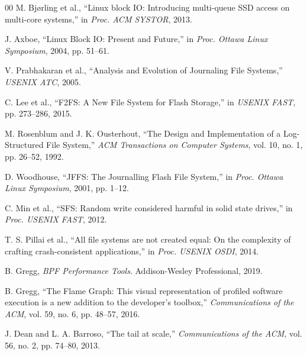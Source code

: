 \documentclass[conference]{IEEEtran}
\begin{document}
\begin{thebibliography}{00}
 M. Bj{\o}rling et al., ``Linux block IO: Introducing multi-queue SSD access on multi-core systems,'' in \textit{Proc. ACM SYSTOR}, 2013.

 J. Axboe, ``Linux Block IO: Present and Future,'' in \textit{Proc. Ottawa Linux Symposium}, 2004, pp. 51--61.

 V. Prabhakaran et al., ``Analysis and Evolution of Journaling File Systems,'' \textit{USENIX ATC}, 2005.

 C. Lee et al., ``F2FS: A New File System for Flash Storage,'' in \textit{USENIX FAST}, pp. 273--286, 2015.

 M. Rosenblum and J. K. Ousterhout, ``The Design and Implementation of a Log-Structured File System,'' \textit{ACM Transactions on Computer Systems}, vol. 10, no. 1, pp. 26--52, 1992.

 D. Woodhouse, ``JFFS: The Journalling Flash File System,'' in \textit{Proc. Ottawa Linux Symposium}, 2001, pp. 1--12.

 C. Min et al., ``SFS: Random write considered harmful in solid state drives,'' in \textit{Proc. USENIX FAST}, 2012.

 T. S. Pillai et al., ``All file systems are not created equal: On the complexity of crafting crash-consistent applications,'' in \textit{Proc. USENIX OSDI}, 2014.

 B. Gregg, \textit{BPF Performance Tools}. Addison-Wesley Professional, 2019.

 B. Gregg, ``The Flame Graph: This visual representation of profiled software execution is a new addition to the developer's toolbox,'' \textit{Communications of the ACM}, vol. 59, no. 6, pp. 48--57, 2016.

 J. Dean and L. A. Barroso, ``The tail at scale,'' \textit{Communications of the ACM}, vol. 56, no. 2, pp. 74--80, 2013.

\end{thebibliography}
\end{document}

